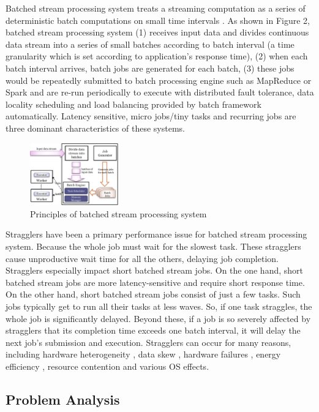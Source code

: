 \documentclass[10pt,conference,compsocconf,letterpaper]{IEEEtran}
\begin{document}
  Batched stream processing system treats a streaming computation as a series of deterministic batch computations on small time intervals \cite{Zaharia2013}. As shown in Figure 2, batched stream processing system (1) receives input data and divides continuous data stream into a series of small batches according to batch interval (a time granularity which is set according to application's response time), (2) when each batch interval arrives, batch jobs are generated for each batch, (3) these jobs would be repeatedly submitted to batch processing engine such as MapReduce or Spark and are re-run periodically to execute with distributed fault tolerance, data locality scheduling and load balancing provided by batch framework automatically. Latency sensitive, micro jobs/tiny tasks and recurring jobs are three dominant characteristics of these systems.
  \begin{figure}[htbp]
    \centering
    \includegraphics[width=0.34\textwidth]{FigureBatchStream}
    \caption{Principles of batched stream processing system}\label{Fig. 2:}
  \end{figure}

  Stragglers have been a primary performance issue for batched stream processing system. Because the whole job must wait for the slowest task. These stragglers cause unproductive wait time for all the others, delaying job completion. Stragglers especially impact short batched stream jobs. On the one hand, short batched stream jobs are more latency-sensitive and require short response time. On the other hand, short batched stream jobs consist of just a few tasks. Such jobs typically get to run all their tasks at less waves. So, if one task straggles, the whole job is significantly delayed. Beyond these, if a job is so severely affected by stragglers that its completion time exceeds one batch interval, it will delay the next job's submission and execution. Stragglers can occur for many reasons, including hardware heterogeneity \cite{Reiss2012}, data skew \cite{Kwon2012}, hardware failures \cite{Ananthanarayanan2010}, energy efficiency \cite{Cheng2015}, resource contention and various OS effects.

\subsection{Problem Analysis}
\end{document}
